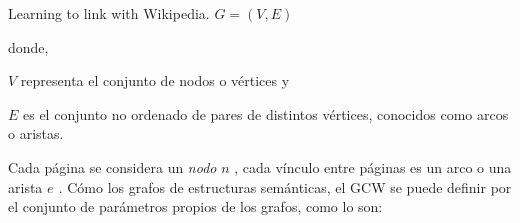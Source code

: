\documentclass[letterpaper]{article}
\newcommand\textstylebibuscitbase[1]{#1}
\begin{document}
{\centering{}
\textstylebibuscitbase{Learning to link with Wikipedia.} $G=(V,E)$
\par}

{\sffamily
\textstylebibuscitbase{donde, }}

{\sffamily
 $V$ \textstylebibuscitbase{ representa el conjunto de nodos o
v\'ertices y}}

{\sffamily
 $E$ \textstylebibuscitbase{es el conjunto no ordenado de pares de
distintos v\'ertices, conocidos como arcos o
}\textstylebibuscitbase{aristas}\textstylebibuscitbase{.}}


\bigskip

{\sffamily
\textstylebibuscitbase{Cada p\'agina se considera un
}\textstylebibuscitbase{\textit{nodo}} $n$ \textstylebibuscitbase{ ,
cada v\'inculo entre p\'aginas es un arco o }\textstylebibuscitbase{una
}\textstylebibuscitbase{arista } $e$ \textstylebibuscitbase{\textit{.
}}\textstylebibuscitbase{C\'omo los grafos de estructuras sem\'anticas,
el GCW se puede }\textstylebibuscitbase{definir por el conjunto de
par\'ametros propios de los grafos, como lo son: }}


\bigskip
\end{document}
